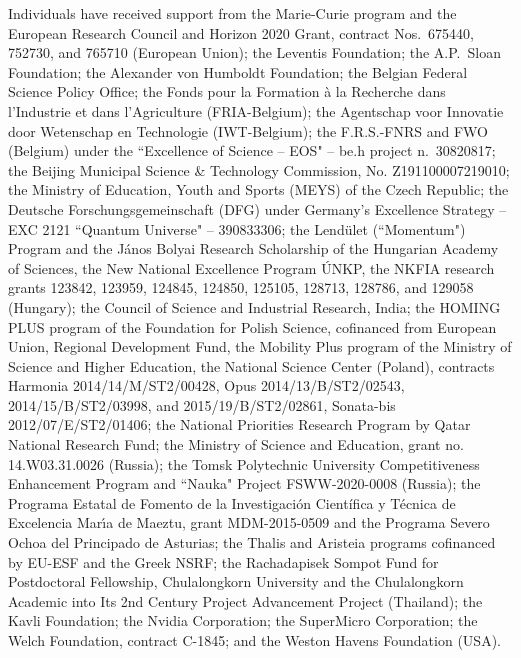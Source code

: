 \begin{acknowledgments}
     Individuals have received support from the Marie-Curie program and the European Research Council and Horizon 2020 Grant, contract Nos.\ 675440, 752730, and 765710 (European Union); the Leventis Foundation; the A.P.\ Sloan Foundation; the Alexander von Humboldt Foundation; the Belgian Federal Science Policy Office; the Fonds pour la Formation \`a la Recherche dans l'Industrie et dans l'Agriculture (FRIA-Belgium); the Agentschap voor Innovatie door Wetenschap en Technologie (IWT-Belgium); the F.R.S.-FNRS and FWO (Belgium) under the ``Excellence of Science -- EOS" -- be.h project n.\ 30820817; the Beijing Municipal Science \& Technology Commission, No. Z191100007219010; the Ministry of Education, Youth and Sports (MEYS) of the Czech Republic; the Deutsche Forschungsgemeinschaft (DFG) under Germany's Excellence Strategy -- EXC 2121 ``Quantum Universe" -- 390833306; the Lend\"ulet (``Momentum") Program and the J\'anos Bolyai Research Scholarship of the Hungarian Academy of Sciences, the New National Excellence Program \'UNKP, the NKFIA research grants 123842, 123959, 124845, 124850, 125105, 128713, 128786, and 129058 (Hungary); the Council of Science and Industrial Research, India; the HOMING PLUS program of the Foundation for Polish Science, cofinanced from European Union, Regional Development Fund, the Mobility Plus program of the Ministry of Science and Higher Education, the National Science Center (Poland), contracts Harmonia 2014/14/M/ST2/00428, Opus 2014/13/B/ST2/02543, 2014/15/B/ST2/03998, and 2015/19/B/ST2/02861, Sonata-bis 2012/07/E/ST2/01406; the National Priorities Research Program by Qatar National Research Fund; the Ministry of Science and Education, grant no. 14.W03.31.0026 (Russia); the Tomsk Polytechnic University Competitiveness Enhancement Program and ``Nauka" Project FSWW-2020-0008 (Russia); the Programa Estatal de Fomento de la Investigaci{\'o}n Cient{\'i}fica y T{\'e}cnica de Excelencia Mar\'{\i}a de Maeztu, grant MDM-2015-0509 and the Programa Severo Ochoa del Principado de Asturias; the Thalis and Aristeia programs cofinanced by EU-ESF and the Greek NSRF; the Rachadapisek Sompot Fund for Postdoctoral Fellowship, Chulalongkorn University and the Chulalongkorn Academic into Its 2nd Century Project Advancement Project (Thailand); the Kavli Foundation; the Nvidia Corporation; the SuperMicro Corporation; the Welch Foundation, contract C-1845; and the Weston Havens Foundation (USA). 
\end{acknowledgments}


